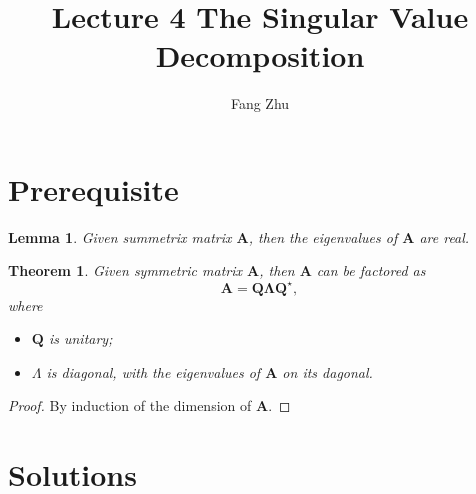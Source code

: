 \documentclass{article}
\author{Fang Zhu}
\title{Lecture 4 The Singular Value Decomposition}
\newtheorem{theorem}{Theorem}[section]
\newtheorem{lemma}{Lemma}[section]
\begin{document}
	\maketitle
	
\section{Prerequisite}
\begin{lemma}
	Given summetrix matrix $\bm{A}$, then the eigenvalues of $\bm{A}$ are real.
\end{lemma}

\begin{theorem}\label{thm:schur-dec-sym-real}
	Given symmetric matrix $\bm{A}$, then $\bm{A}$ can be factored as
	$$
		\bm{A} = \bm{Q} \bm{\Lambda} \bm{Q}^{\star},
	$$
	where
	\begin{itemize}
		\item $\bm{Q}$ is unitary; 
		\item $\Lambda$ is diagonal, with the eigenvalues of $\bm{A}$ on its dagonal.
	\end{itemize}
\end{theorem}
\begin{proof}
	By induction of the dimension of $\bm{A}$.
\end{proof}

\section{Solutions}
\end{document}
